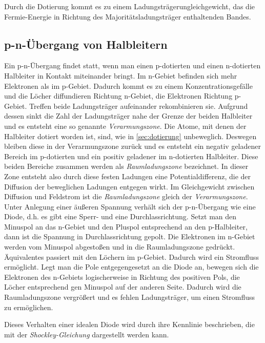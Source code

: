 \documentclass[slug=SZ, room=Hermann-Krone-Bau\,\ Labor\ 1.25, supervisor=Martin\ Kroll]{../../Lab_Report_LaTeX/lab_report}
\begin{document}
Durch die Dotierung kommt es zu einem Ladungsträgerungleichgewicht, das die Fermie-Energie in Richtung des
Majoritätsladungsträger enthaltenden Bandes.

\subsection{p-n-Übergang von Halbleitern}
\label{sec:pnüber}

Ein p-n-Übergang findet statt, wenn man einen p-dotierten und einen n-dotierten Halbleiter in Kontakt miteinander
bringt. Im n-Gebiet befinden sich mehr Elektronen als im p-Gebiet. Dadurch kommt es zu einem Konzentrationsgefälle
und die Löcher diffundieren Richtung n-Gebiet, die Elektronen Richtung p-Gebiet. Treffen beide Ladungsträger
aufeinander rekombinieren sie. Aufgrund dessen sinkt die Zahl der Ladungsträger nahe der Grenze der beiden
Halbleiter und es entsteht eine so genannte \emph{Verarmungszone}. Die Atome, mit denen der Halbleiter
dotiert worden ist, sind, wie in \ref{sec:dotierung} unbeweglich. Deswegen bleiben diese in der Verarmungszone
zurück und es entsteht ein negativ geladener Bereich im p-dotierten und ein positiv geladener im
n-dotierten Halbleiter. Diese beiden Bereiche zusammen werden als \emph{Raumladungszone} bezeichnet.
In dieser Zone entsteht also durch diese festen Ladungen eine Potentialdifferenz, die der Diffusion der
beweglichen Ladungen entgegen wirkt. Im Gleichgewicht zwischen Diffusion und Feldstrom ist die
\emph{Raumladungszone} gleich der \emph{Verarmungszone}.\\

Unter Anlegung einer äußeren Spannung verhält sich der p-n-Übergang wie eine Diode, d.h. es gibt eine Sperr-
und eine Durchlassrichtung.
Setzt man den Minuspol an das n-Gebiet und den Pluspol entsprechend an den p-Halbleiter, dann ist die Spannung
in Durchlassrichtung gepolt. Die Elektronen im n-Gebiet werden vom Minuspol abgestoßen und in die Raumladungszone
gedrückt. Äquivalentes passiert mit den Löchern im p-Gebiet. Dadurch wird ein Stromfluss ermöglicht.
Legt man die Pole entgegengesetzt an die Diode an, bewegen sich die Elektronen des n-Gebiets logischerweise in
Richtung des positiven Pols, die Löcher entsprechend gen Minuspol auf der anderen Seite. Dadurch wird die
Raumladungszone vergrößert und es fehlen Ladungsträger, um einen Stromfluss zu ermöglichen.

Dieses Verhalten einer idealen Diode wird durch ihre Kennlinie beschrieben, die mit der \emph{Shockley-Gleichung}
dargestellt werden kann.
\end{document}

